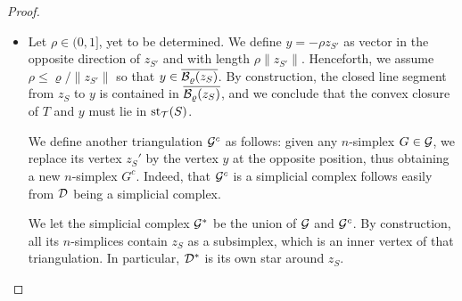 \documentclass[10pt,a4paper]{article}
\begin{document}
\begin{proof}
\begin{itemize}
        
        \item 
        Let $\rho \in (0,1]$, yet to be determined. 
        We define $y = - \rho z_{S'}$ as vector in the opposite direction of $z_{S'}$ and with length $\rho \|z_{S'}\|$. 
        Henceforth, we assume $\rho \leq \varrho / \|z_{S'}\|$ so that $y \in \overline{{\mathcal B}_{\varrho}(z_S)}$.  
        By construction, the closed line segment from $z_{S}$ to $y$ is contained in $\overline{{\mathcal B}_{\varrho}(z_S)}$,
        and we conclude that the convex closure of $T$ and $y$ must lie in $\operatorname{st}_{{\mathcal T}}(S)$.
        
        We define another triangulation ${\mathcal G}^{c}$ as follows:
        given any $n$-simplex $G \in {\mathcal G}$, 
        we replace its vertex $z_{S}'$ by the vertex $y$ at the opposite position,
        thus obtaining a new $n$-simplex $G^{c}$. 
        Indeed, that ${\mathcal G}^c$ is a simplicial complex follows easily from ${\mathcal D}$ being a simplicial complex. 
        
        We let the simplicial complex ${\mathcal G}^\ast$ be the union of ${\mathcal G}$ and ${\mathcal G}^c$. 
        By construction, all its $n$-simplices contain $z_{S}$ as a subsimplex, which is an inner vertex of that triangulation. 
        In particular, ${\mathcal D}^\ast$ is its own star around $z_{S}$.
        

\end{itemize}
\end{proof}
\end{document}
